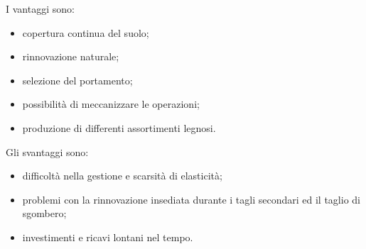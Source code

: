\documentclass{article}
\begin{document}
I vantaggi sono:
\begin{itemize}
    \item copertura continua del suolo;
    \item rinnovazione naturale;
    \item selezione del portamento;
    \item possibilità di meccanizzare le operazioni;
    \item produzione di differenti assortimenti legnosi.
\end{itemize}
Gli svantaggi sono:
\begin{itemize}
    \item difficoltà nella gestione e scarsità di elasticità;
    \item problemi con la rinnovazione insediata durante i tagli secondari ed il taglio di sgombero;
    \item investimenti e ricavi lontani nel tempo.
    \end{itemize}
\end{document}
